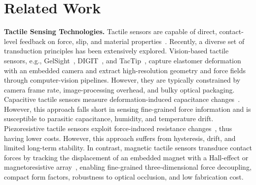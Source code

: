 \section{Related Work}

\noindent\textbf{Tactile Sensing Technologies.} Tactile sensors are capable of direct, contact-level feedback on force, slip, and material properties~\cite{dahiya2009tactile, li2020tactile}. 
Recently, a diverse set of transduction principles has been extensively explored.
Vision-based tactile sensors, e.g., GelSight~\cite{yuan2017gelsight}, DIGIT~\cite{lambeta2020digit}, and TacTip~\cite{ward2018tactip}, capture elastomer deformation with an embedded camera and extract high-resolution geometry and force fields through computer-vision pipelines.
However, they are typically constrained by camera frame rate, image-processing overhead, and bulky optical packaging.
Capacitive tactile sensors measure deformation-induced capacitance changes~\cite{schmitz2011methods}.
However, this approach falls short in sensing fine-grained force information and is susceptible to parasitic capacitance, humidity, and temperature drift.
Piezoresistive tactile sensors exploit force-induced resistance changes~\cite{stassi2014flexible}, thus having lower costs.
However, this approach suffers from hysteresis, drift, and limited long-term stability.
In contrast, magnetic tactile sensors transduce contact forces by tracking the displacement of an embedded magnet with a Hall-effect or magnetoresistive array~\cite{bhirangi2021reskin, yan2021softmagnetic}, enabling fine-grained three-dimensional force decoupling, compact form factors, robustness to optical occlusion, and low fabrication cost.

